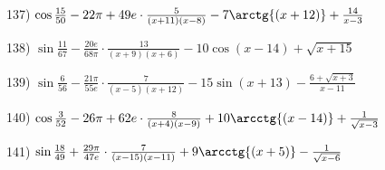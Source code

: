 \documentclass[11pt,ukrainian]{article}
\begin{document}
\smallskip\par
137) \space 
{ ${\cos\frac{15}{50}} - 22{\pi} + 49 e\cdot {\frac{5}{(x + 11)(x - 8)}} - {7\arctg{(x + 12)}} + { \frac{14}{x - 3}}$}
\smallskip\par
138) \space 
{ ${\sin\frac{11}{67}} - \frac{20 e}{68{\pi}}\cdot {\frac{13}{(x + 9)(x + 6)}} - {10\cos{(x - 14)}} + {\sqrt{x + 15}}$}
\smallskip\par
139) \space 
{ ${\sin\frac{6}{56}} - \frac{21{\pi}}{55 e}\cdot {\frac{7}{(x - 5)(x + 12)}} - {15\sin{(x + 13)}} - {\frac{6 + \sqrt{x + 3}}{x - 11}}$}
\smallskip\par
140) \space 
{ ${\cos\frac{3}{52}} - 26{\pi} + 62 e\cdot {\frac{8}{(x + 4)(x - 9)}} + {10\arcctg{(x - 14)}} + {\frac{1}{\sqrt{x - 3}}}$}
\smallskip\par
141) \space 
{ ${\sin\frac{18}{49}} + \frac{29{\pi}}{47 e}\cdot {\frac{7}{(x - 15)(x - 11)}} + {9\arcctg{(x + 5)}} - {\frac{1}{\sqrt{x - 6}}}$}
\smallskip\par
\end{document}
